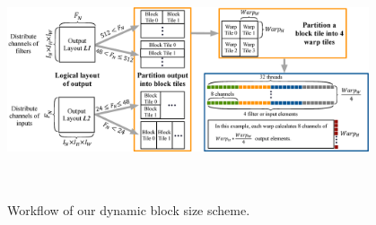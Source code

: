 \begin{figure}
	\centering
    \includegraphics[width=0.95\textwidth,height=7cm]{./figure/pwworkflow.eps}
    \caption{Workflow of our dynamic block size scheme.} \label{fig:pwworkflow}
\end{figure}
